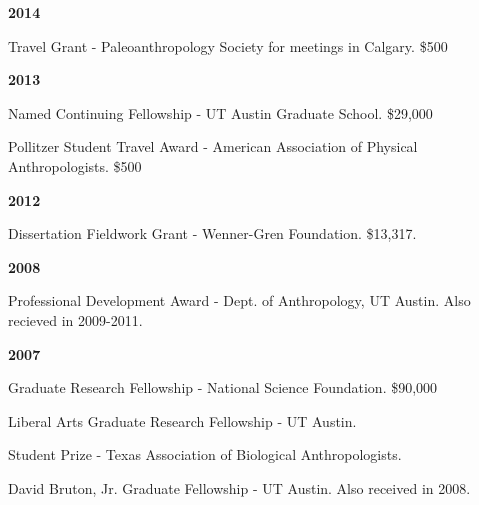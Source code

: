 \documentclass{article}
\begin{document}
\begin{description*}
\item[] {\bfseries 2014}
\item[] Travel Grant - Paleoanthropology Society for meetings in Calgary. \$500
\end{description*}


\begin{description*}
\item[] {\bfseries 2013}
\item[] Named Continuing Fellowship - UT Austin Graduate School. \$29,000
\item[] Pollitzer Student Travel Award - American Association of Physical Anthropologists. \$500
\end{description*}


\begin{description*}
\item[] {\bfseries 2012}
\item[] Dissertation Fieldwork Grant - Wenner-Gren Foundation. \$13,317.
\end{description*}

\newpage
\begin{description*}
\item[] {\bfseries 2008}
\item[] Professional Development Award - Dept. of Anthropology, UT Austin. Also recieved in 2009-2011.
\end{description*}

\begin{description*}
\item[] {\bfseries 2007}
\item[] Graduate Research Fellowship - National Science Foundation. \$90,000

\item[] Liberal Arts Graduate Research Fellowship - UT Austin.

\item[] Student Prize - Texas Association of Biological Anthropologists.

\item[] David Bruton, Jr. Graduate Fellowship - UT Austin. Also received in 2008.
\end{description*}
\end{document}
